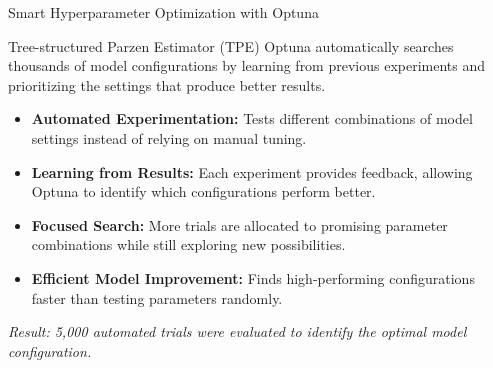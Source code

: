 \begin{frame}{Smart Hyperparameter Optimization with Optuna}
\begin{block}{Tree-structured Parzen Estimator (TPE)}
Optuna automatically searches thousands of model configurations by learning from previous experiments and prioritizing the settings that produce better results.
\end{block}
\scriptsize
\begin{itemize}
    \item \textbf{Automated Experimentation:}
    Tests different combinations of model settings instead of relying on manual tuning.

    \item \textbf{Learning from Results:}
    Each experiment provides feedback, allowing Optuna to identify which configurations perform better.

    \item \textbf{Focused Search:}
    More trials are allocated to promising parameter combinations while still exploring new possibilities.

    \item \textbf{Efficient Model Improvement:}
    Finds high-performing configurations faster than testing parameters randomly.
\end{itemize}

\vspace{0.2cm}

\begin{center}
\scriptsize
\textit{Result: 5,000 automated trials were evaluated to identify the optimal model configuration.}
\end{center}

\end{frame}


